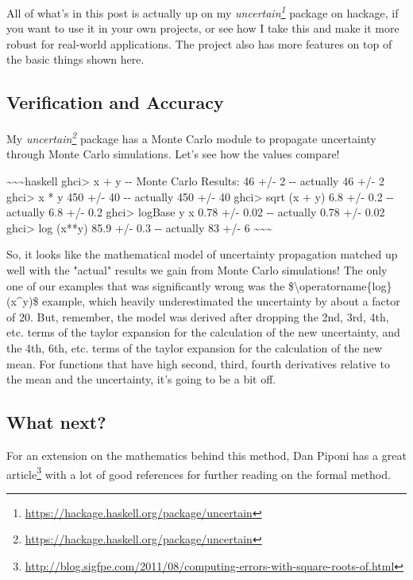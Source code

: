 \documentclass[]{article}
\renewcommand{\href}[2]{#2\footnote{\url{#1}}}
\begin{document}
All of what's in this post is actually up on my
\emph{\href{https://hackage.haskell.org/package/uncertain}{uncertain}} package
on hackage, if you want to use it in your own projects, or see how I take this
and make it more robust for real-world applications. The project also has more
features on top of the basic things shown here.

\subsection{Verification and Accuracy}

My \emph{\href{https://hackage.haskell.org/package/uncertain}{uncertain}}
package has a Monte Carlo module to propagate uncertainty through Monte Carlo
simulations. Let's see how the values compare!

\textasciitilde{}\textasciitilde{}\textasciitilde{}haskell ghci\textgreater{} x
+ y -\/- Monte Carlo Results: 46 +/- 2 -\/- actually 46 +/- 2 ghci\textgreater{}
x * y 450 +/- 40 -\/- actually 450 +/- 40 ghci\textgreater{} sqrt (x + y) 6.8
+/- 0.2 -\/- actually 6.8 +/- 0.2 ghci\textgreater{} logBase y x 0.78 +/- 0.02
-\/- actually 0.78 +/- 0.02 ghci\textgreater{} log (x**y) 85.9 +/- 0.3 -\/-
actually 83 +/- 6 \textasciitilde{}\textasciitilde{}\textasciitilde{}

So, it looks like the mathematical model of uncertainty propagation matched up
well with the "actual" results we gain from Monte Carlo simulations! The only
one of our examples that was significantly wrong was the
\$\textbackslash{}operatorname\{log\}(x\^{}y)\$ example, which heavily
underestimated the uncertainty by about a factor of 20. But, remember, the model
was derived after dropping the 2nd, 3rd, 4th, etc. terms of the taylor expansion
for the calculation of the new uncertainty, and the 4th, 6th, etc. terms of the
taylor expansion for the calculation of the new mean. For functions that have
high second, third, fourth derivatives relative to the mean and the uncertainty,
it's going to be a bit off.

\subsection{What next?}

For an extension on the mathematics behind this method, Dan Piponi has a
\href{http://blog.sigfpe.com/2011/08/computing-errors-with-square-roots-of.html}{great
article} with a lot of good references for further reading on the formal method.
\end{document}
